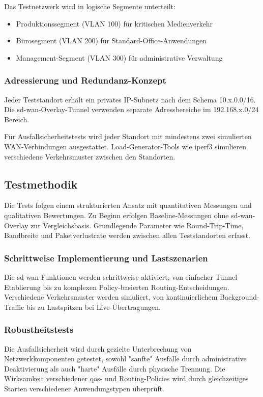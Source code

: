 Das Testnetzwerk wird in logische Segmente unterteilt:
\begin{itemize}
	\item Produktionssegment (VLAN 100) für kritischen Medienverkehr
	\item Bürosegment (VLAN 200) für Standard-Office-Anwendungen
	\item Management-Segment (VLAN 300) für administrative Verwaltung
\end{itemize}

\subsubsection*{Adressierung und Redundanz-Konzept}

Jeder Teststandort erhält ein privates IP-Subnetz nach dem Schema 10.x.0.0/16. Die \ac{sd-wan}-Overlay-Tunnel verwenden separate Adressbereiche im 192.168.x.0/24 Bereich.

Für Ausfallsicherheitstests wird jeder Standort mit mindestens zwei simulierten WAN-Verbindungen ausgestattet. Load-Generator-Tools wie iperf3 simulieren verschiedene Verkehrsmuster zwischen den Standorten.

\subsection*{Testmethodik}
Die Tests folgen einem strukturierten Ansatz mit quantitativen Messungen und qualitativen Bewertungen. Zu Beginn erfolgen Baseline-Messungen ohne \ac{sd-wan}-Overlay zur Vergleichsbasis. Grundlegende Parameter wie Round-Trip-Time, Bandbreite und Paketverlustrate werden zwischen allen Teststandorten erfasst.

\subsubsection*{Schrittweise Implementierung und Lastszenarien}

Die \ac{sd-wan}-Funktionen werden schrittweise aktiviert, von einfacher Tunnel-Eta\-blierung bis zu komplexen Policy-basierten Routing-Entscheidungen. Verschiedene Verkehrsmuster werden simuliert, von kontinuierlichem Background-Traffic bis zu Lastspitzen bei Live-Übertragungen.

\subsubsection*{Robustheitstests}

Die Ausfallsicherheit wird durch gezielte Unterbrechung von Netzwerkkomponenten getestet, sowohl "sanfte" Ausfälle durch administrative Deaktivierung als auch "harte" Ausfälle durch physische Trennung. Die Wirksamkeit verschiedener \ac{qos}- und Routing-Policies wird durch gleichzeitiges Starten verschiedener Anwendungstypen überprüft.

